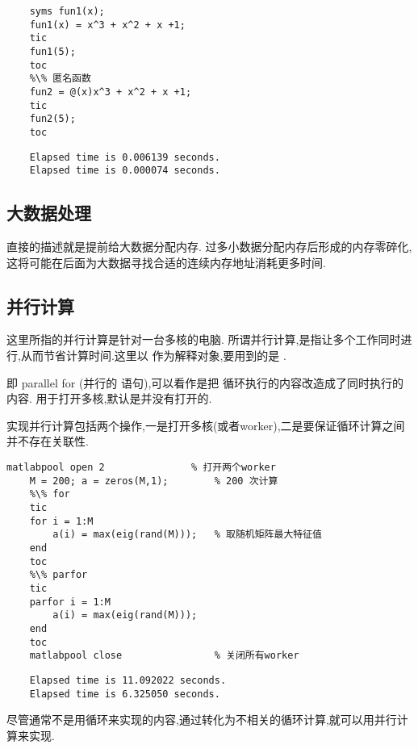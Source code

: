   \vspace{-0.8cm}
  \begin{lstlisting}[caption = 不同函数类型效率对比]
    %\% 符号函数
    syms fun1(x);
    fun1(x) = x^3 + x^2 + x +1;
    tic
    fun1(5);
    toc
    %\% 匿名函数
    fun2 = @(x)x^3 + x^2 + x +1;
    tic
    fun2(5);
    toc
  \end{lstlisting}

  \vspace{-0.8cm}
  \begin{lstlisting}
    Elapsed time is 0.006139 seconds.
    Elapsed time is 0.000074 seconds.
  \end{lstlisting}



\subsection{大数据处理}
 直接的描述就是提前给大数据分配内存. 过多小数据分配内存后形成的内存零碎化,这将可能在后面为大数据寻找合适的连续内存地址消耗更多时间.



\subsection{并行计算}
 这里所指的并行计算是针对一台多核的电脑.
 所谓并行计算,是指让多个工作同时进行,从而节省计算时间.这里以  作为解释对象,要用到的是 .\par
  即 parallel for (并行的  语句),可以看作是把  循环执行的内容改造成了同时执行的内容.  用于打开多核,默认是并没有打开的.\par
 实现并行计算包括两个操作,一是打开多核(或者worker),二是要保证循环计算之间并不存在关联性.

  \vspace{-0.8cm}
  \begin{lstlisting}[caption = 并行计算parfor与for效率对比]
    matlabpool open 2               % 打开两个worker
    M = 200; a = zeros(M,1);        % 200 次计算
    %\% for
    tic  
    for i = 1:M        
        a(i) = max(eig(rand(M)));   % 取随机矩阵最大特征值
    end 
    toc
    %\% parfor
    tic  
    parfor i = 1:M 
        a(i) = max(eig(rand(M))); 
    end 
    toc
    matlabpool close                % 关闭所有worker
  \end{lstlisting}

  \vspace{-0.8cm}
  \begin{lstlisting}
    Elapsed time is 11.092022 seconds.
    Elapsed time is 6.325050 seconds.
  \end{lstlisting}

尽管通常不是用循环来实现的内容,通过转化为不相关的循环计算,就可以用并行计算来实现.





